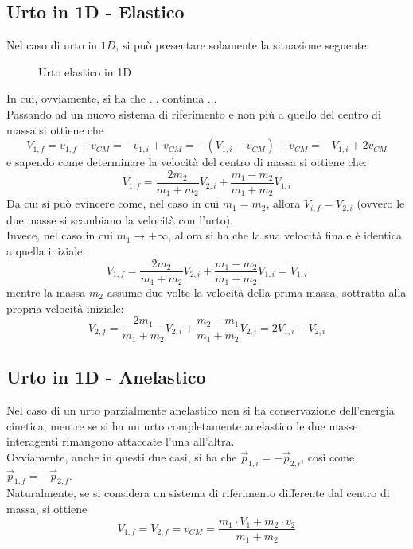 \documentclass[a4paper]{extarticle}
\begin{document}
\vspace{1em}
\subsection{Urto in 1D - Elastico}
Nel caso di urto in $1D$, si può presentare solamente la situazione seguente:

\begin{figure}[H]
  \centering
  \hspace{1em}
  \caption{Urto elastico in 1D}
  \label{fig:urto_elastico_1D}
\end{figure}

\vspace{1em}
\noindent
In cui, ovviamente, si ha che ... continua ...\\
Passando ad un nuovo sistema di riferimento e non più a quello del centro di massa si ottiene che
\[V_{1,f} = v_{1,f} + v_{CM} = -v_{1,i} + v_{CM} = - \left(V_{1,i} - v_{CM}\right) + v_{CM} = -V_{1,i} + 2 v_{CM}\]
e sapendo come determinare la velocità del centro di massa si ottiene che:
\[\boxed{V_{1,f} = \frac{2 m_2}{m_1 + m_2} V_{2,i} + \frac{m_1-m_2}{m_1+m_2} V_{1,i}}\]
Da cui si può evincere come, nel caso in cui $m_1=m_2$, allora $V_{i,f}=V_{2,i}$ (ovvero le due masse si scambiano la velocità con l'urto).\\
Invece, nel caso in cui $m_1 \to +\infty$, allora si ha che la sua velocità finale è identica a quella iniziale:
\[V_{1,f} = \frac{2 m_2}{m_1 + m_2} V_{2,i} + \frac{m_1-m_2}{m_1+m_2} V_{1,i} = V_{1,i}\]
mentre la massa $m_2$ assume due volte la velocità della prima massa, sottratta alla propria velocità iniziale:
\[V_{2,f} = \frac{2 m_1}{m_1 + m_2} V_{2,i} + \frac{m_2-m_1}{m_1+m_2} V_{2,i} = 2 V_{1,i} - V_{2,i}\]

\vspace{1em}
\subsection{Urto in 1D - Anelastico}
Nel caso di un urto parzialmente anelastico non si ha conservazione dell'energia cinetica, mentre se si ha un urto completamente anelastico le due masse interagenti rimangono attaccate l'una all'altra.\\
Ovviamente, anche in questi due casi, si ha che $\vec p_{1,i} = -\vec p_{2,i}$, così come $\vec p_{1,f} = - \vec p_{2,f}$.\\
Naturalmente, se si considera un sistema di riferimento differente dal centro di massa, si ottiene
\[\boxed{V_{1,f} = V_{2,f} = v_{CM} = \frac{m_1 \cdot V_1 + m_2 \cdot v_2}{m_1 + m_2}}\]
\end{document}
